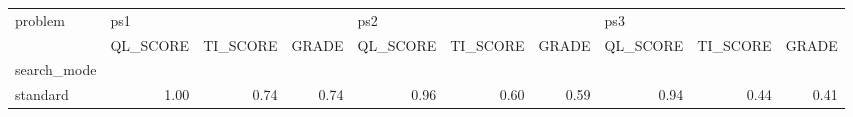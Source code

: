 \begin{tabular}{lrrrrrrrrr}
\toprule
problem & \multicolumn{3}{l}{ps1} & \multicolumn{3}{l}{ps2} & \multicolumn{3}{l}{ps3} \\
{} & QL\_SCORE & TI\_SCORE & GRADE & QL\_SCORE & TI\_SCORE & GRADE & QL\_SCORE & TI\_SCORE & GRADE \\
search\_mode &          &          &       &          &          &       &          &          &       \\
\midrule
standard    &     1.00 &     0.74 &  0.74 &     0.96 &     0.60 &  0.59 &     0.94 &     0.44 &  0.41 \\
\bottomrule
\end{tabular}

